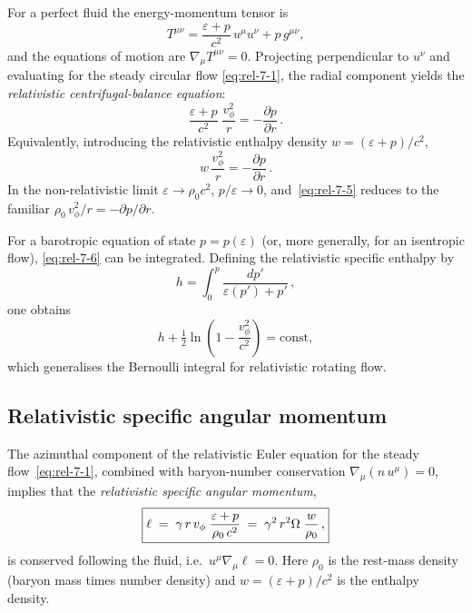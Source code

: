 For a perfect fluid the energy-momentum tensor is
\begin{equation}
\label{eq:rel-7-4}
T^{\mu\nu} = \frac{\varepsilon+p}{c^{2}}\,u^{\mu}u^{\nu}
             + p\,g^{\mu\nu},
\end{equation}
and the equations of motion are $\nabla_{\mu}T^{\mu\nu}=0$.
Projecting perpendicular to $u^{\nu}$ and evaluating for the
steady circular flow \eqref{eq:rel-7-1}, the radial component yields
the \emph{relativistic centrifugal-balance equation}:
\begin{equation}
\label{eq:rel-7-5}
\boxed{\frac{\varepsilon+p}{c^{2}}\;\frac{v_{\phi}^{2}}{r}
       = -\frac{\partial p}{\partial r}\,.}
\end{equation}
Equivalently, introducing the relativistic enthalpy density
$w=(\varepsilon+p)/c^{2}$,
\begin{equation}
\label{eq:rel-7-6}
w\,\frac{v_{\phi}^{2}}{r} = -\frac{\partial p}{\partial r}\,.
\end{equation}
In the non-relativistic limit $\varepsilon\to\rho_{0}c^{2}$,
$p/\varepsilon\to 0$, and~\eqref{eq:rel-7-5} reduces to the familiar
$\rho_{0}\,v_{\phi}^{2}/r = -\partial p/\partial r$.

For a barotropic equation of state $p=p(\varepsilon)$ (or, more
generally, for an isentropic flow), \eqref{eq:rel-7-6} can be
integrated.  Defining the relativistic specific enthalpy by
\begin{equation}
\label{eq:rel-7-7}
h = \int_{0}^{p}\frac{dp'}{\varepsilon(p')+p'}\,,
\end{equation}
one obtains
\begin{equation}
\label{eq:rel-7-8}
h + \tfrac{1}{2}\ln\!\left(1-\frac{v_{\phi}^{2}}{c^{2}}\right) = \text{const},
\end{equation}
which generalises the Bernoulli integral for relativistic rotating flow.

\subsection{Relativistic specific angular momentum}
\label{sec:rel-7-65c}

The azimuthal component of the relativistic Euler equation for the
steady flow~\eqref{eq:rel-7-1}, combined with baryon-number
conservation $\nabla_{\mu}(n\,u^{\mu})=0$, implies that the
\emph{relativistic specific angular momentum},
\begin{equation}
\label{eq:rel-7-9}
\boxed{\ell \;=\; \gamma\,r\,v_{\phi}\;\frac{\varepsilon+p}
               {\rho_{0}\,c^{2}}
       \;=\; \gamma^{2}\,r^{2}\Omega\;\frac{w}{\rho_{0}}\,,}
\end{equation}
is conserved following the fluid, i.e.\ $u^{\mu}\nabla_{\mu}\ell=0$.
Here $\rho_{0}$ is the rest-mass density (baryon mass times number
density) and $w=(\varepsilon+p)/c^{2}$ is the enthalpy density.


